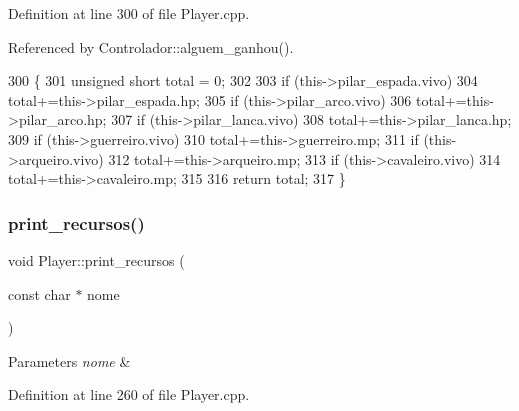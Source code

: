 Definition at line 300 of file Player.\+cpp.



Referenced by Controlador\+::alguem\+\_\+ganhou().


\begin{DoxyCode}
300                                  \{
301     \textcolor{keywordtype}{unsigned} \textcolor{keywordtype}{short} total = 0;
302 
303     \textcolor{keywordflow}{if} (this->pilar\_espada.vivo)
304         total+=this->pilar\_espada.hp;
305     \textcolor{keywordflow}{if} (this->pilar\_arco.vivo)
306         total+=this->pilar\_arco.hp;
307     \textcolor{keywordflow}{if} (this->pilar\_lanca.vivo)
308         total+=this->pilar\_lanca.hp;
309     \textcolor{keywordflow}{if} (this->guerreiro.vivo)
310         total+=this->guerreiro.mp;
311     \textcolor{keywordflow}{if} (this->arqueiro.vivo)
312         total+=this->arqueiro.mp;
313     \textcolor{keywordflow}{if} (this->cavaleiro.vivo)
314         total+=this->cavaleiro.mp;
315 
316     \textcolor{keywordflow}{return} total;
317 \}
\end{DoxyCode}
\mbox{\label{class_player_a7086da1dce5a9de1c2cf29a15ace5a7d}} 
\subsubsection{\texorpdfstring{print\+\_\+recursos()}{print\_recursos()}}
{\footnotesize\ttfamily void Player\+::print\+\_\+recursos (\begin{DoxyParamCaption}\item[{const char $\ast$}]{nome }\end{DoxyParamCaption})}


\begin{DoxyParams}{Parameters}
{\em nome} & \\
\hline
\end{DoxyParams}


Definition at line 260 of file Player.\+cpp.


